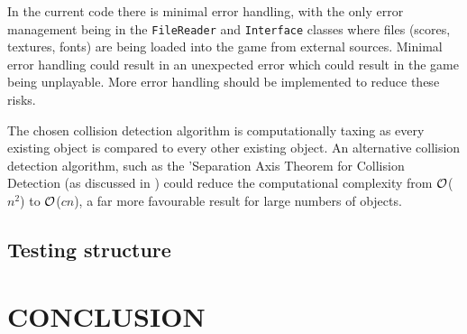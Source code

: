 \documentclass[10pt,twocolumn]{witseiepaper}
\begin{document}

In the current code there is minimal error handling, with the only error management being in the \texttt{FileReader} and \texttt{Interface} classes where files (scores, textures, fonts) are being loaded into the game from external sources. Minimal error handling could result in an unexpected error which could result in the game being unplayable. More error handling should be implemented to reduce these risks.

The chosen collision detection algorithm is computationally taxing as every existing object is compared to every other existing object. An alternative collision detection algorithm, such as the 'Separation Axis Theorem for Collision Detection (as discussed in \cite{Collision_detection}) could reduce the computational complexity from $\cal{O}$($n^{2}$) to $\cal{O}$($cn$), a far more favourable result for large numbers of objects.


\subsection{Testing structure}





\section{CONCLUSION}

%



\end{document}
